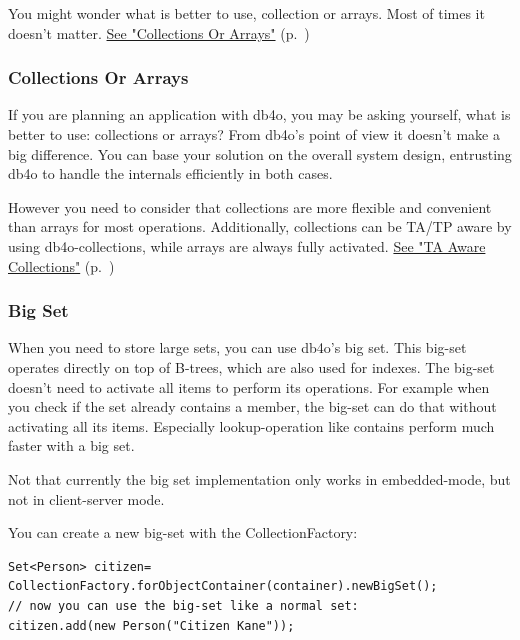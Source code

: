 You might wonder what is better to use, collection or arrays. Most of times it doesn't matter. \hyperref[ref:advanced-topics-type-handling-collections-collections-or-arrays]{See "Collections Or Arrays"} (p.~\pageref{ref:advanced-topics-type-handling-collections-collections-or-arrays})

\subsubsection{Collections Or Arrays}
\label{ref:advanced-topics-type-handling-collections-collections-or-arrays}

If you are planning an application with db4o, you may be asking yourself, what is better to use: collections or arrays? From db4o's point of view it doesn't make a big difference. You can base your solution on the overall system design, entrusting db4o to handle the internals efficiently in both cases.

However you need to consider that collections are more flexible and convenient than arrays for most operations. Additionally, collections can be TA/TP aware by using db4o-collections, while arrays are always fully activated. \hyperref[ref:basics-transparentpersistence-collections]{See "TA Aware Collections"} (p.~\pageref{ref:basics-transparentpersistence-collections})

\subsubsection{Big Set}
\label{ref:advanced-topics-type-handling-collections-big-set}

When you need to store large sets, you can use db4o's big set. This big-set operates directly on top of B-trees, which are also used for indexes. The big-set doesn't need to activate all items to perform its operations. For example when you check if the set already contains a member, the big-set can do that without activating all its items. Especially lookup-operation like contains perform much faster with a big set.

Not that currently the big set implementation only works in embedded-mode, but not in client-server mode.

You can create a new big-set with the CollectionFactory:

\begin{lstlisting}
Set<Person> citizen= CollectionFactory.forObjectContainer(container).newBigSet();
// now you can use the big-set like a normal set:
citizen.add(new Person("Citizen Kane"));
\end{lstlisting}

